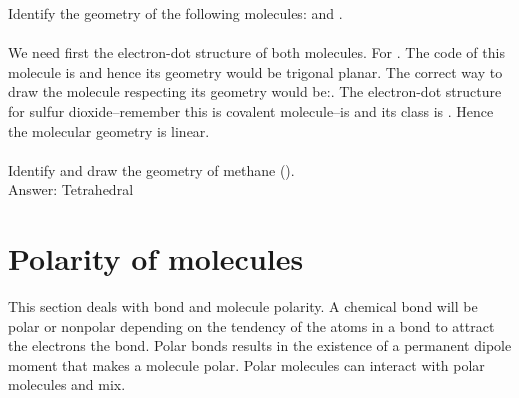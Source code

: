 \documentclass[main.tex]{subfiles}
\begin{document}
\begin{description}
\begin{example} %
Identify the geometry of the following molecules:  and .\\
\\
We need first the electron-dot structure of both molecules. For  \hspace{.05in}.\hspace{.05in} The code of this molecule is  and hence its geometry would be trigonal planar. The correct way to draw the molecule respecting its geometry would be:\hspace{.05in}\hspace{.05in}. The electron-dot structure for sulfur dioxide--remember this is covalent molecule--is \hspace{.05in}\hspace{.05in} and its class is . Hence the molecular geometry is linear.\\
\faDiamond\ \\
Identify and draw the geometry of methane ().\\
\flushright Answer: Tetrahedral \hspace{.05in}\hspace{.05in}
\end{example}%
\end{description}


\section{Polarity of molecules}
This section deals with bond and molecule polarity. A chemical bond will be polar or nonpolar depending on the tendency of the atoms in a bond to attract the electrons the bond. Polar bonds results in the existence of a permanent dipole moment that makes a molecule polar. Polar molecules can interact with polar molecules and mix. 
\end{document}
